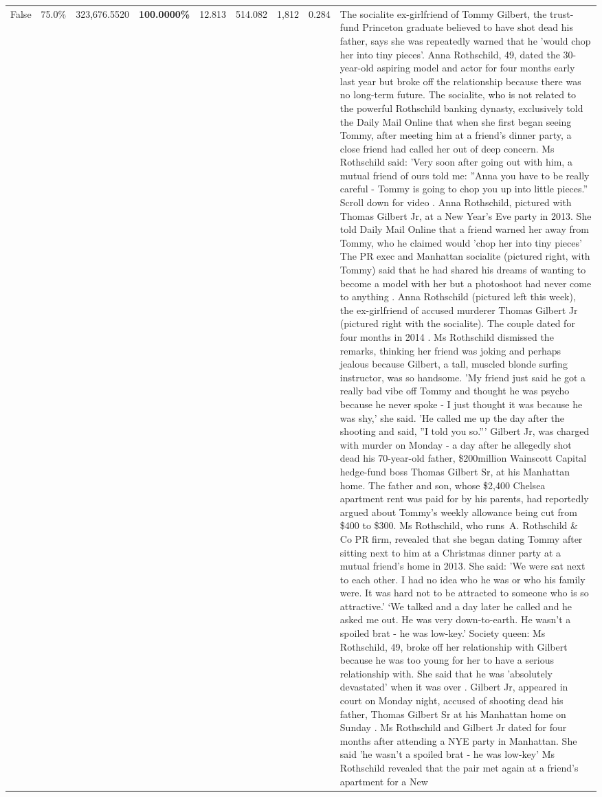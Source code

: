 \begin{table}[H]
\begin{tabular}{lllrlllll}
False & 75.0\% & 323,676.5520 & \bfseries \color{red} 100.0000\% & 12.813 & 514.082 & 1,812 & 0.284 & The socialite ex-girlfriend of Tommy Gilbert, the trust-fund Princeton graduate believed to have shot dead his father, says she was repeatedly warned that he 'would chop her into tiny pieces'. Anna Rothschild, 49, dated the 30-year-old aspiring model and actor for four months early last year but broke off the relationship because there was no long-term future. The socialite, who is not related to the powerful Rothschild banking dynasty, exclusively told the Daily Mail Online that when she first began seeing Tommy, after meeting him at a friend's dinner party, a close friend had called her out of deep concern. Ms Rothschild said: 'Very soon after going out with him, a mutual friend of ours told me: ''Anna you have to be really careful - Tommy is going to chop you up into little pieces.'' Scroll down for video . Anna Rothschild, pictured with Thomas Gilbert Jr, at a New Year's Eve party in 2013. She told Daily Mail Online that a friend warned her away from Tommy, who he claimed would 'chop her into tiny pieces' The PR exec and Manhattan socialite (pictured right, with Tommy) said that he had shared his dreams of wanting to become a model with her but a photoshoot had never come to anything . Anna Rothschild (pictured left this week), the ex-girlfriend of accused murderer Thomas Gilbert Jr (pictured right with the socialite). The couple dated for four months in 2014 . Ms Rothschild dismissed the remarks, thinking her friend was joking and perhaps jealous because Gilbert, a tall, muscled blonde surfing instructor, was so handsome. 'My friend just said he got a really bad vibe off Tommy and thought he was psycho because he never spoke - I just thought it was because he was shy,' she said. 'He called me up the day after the shooting and said, ''I told you so.''' Gilbert Jr, was charged with murder on Monday - a day after he allegedly shot dead his 70-year-old father, \$200million Wainscott Capital hedge-fund boss Thomas Gilbert Sr, at his Manhattan home. The father and son, whose \$2,400 Chelsea apartment rent was paid for by his parents, had reportedly argued about Tommy's weekly allowance being cut from \$400 to \$300. Ms Rothschild, who runs A. Rothschild \& Co PR firm, revealed that she began dating Tommy after sitting next to him at a Christmas dinner party at a mutual friend's home in 2013. She said: 'We were sat next to each other. I had no idea who he was or who his family were. It was hard not to be attracted to someone who is so attractive.' ‘We talked and a day later he called and he asked me out. He was very down-to-earth. He wasn’t a spoiled brat - he was low-key.’ Society queen: Ms Rothschild, 49, broke off her relationship with Gilbert because he was too young for her to have a serious relationship with. She said that he was 'absolutely devastated' when it was over . Gilbert Jr, appeared in court on Monday night, accused of shooting dead his father, Thomas Gilbert Sr at his Manhattan home on Sunday . Ms Rothschild and Gilbert Jr dated for four months after attending a NYE party in Manhattan. She said 'he wasn't a spoiled brat - he was low-key' Ms Rothschild revealed that the pair met again at a friend’s apartment for a New 
\end{tabular}
\end{table}
